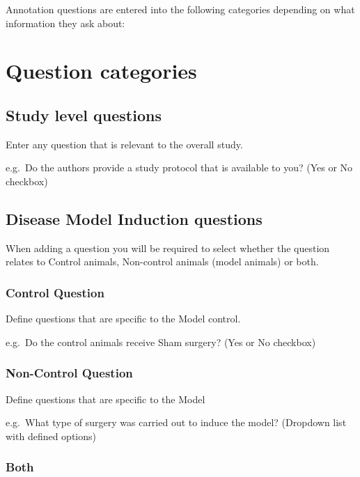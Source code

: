 \documentclass[
]{book}
\begin{document}
Annotation questions are entered into the following categories depending on what information they ask about:

\hypertarget{question-categories-1}{%
\section{Question categories}\label{question-categories-1}}

\hypertarget{study-level-questions}{%
\subsection{Study level questions}\label{study-level-questions}}

Enter any question that is relevant to the overall study.

e.g.~Do the authors provide a study protocol that is available to you?
(Yes or No checkbox)

\hypertarget{disease-model-induction-questions}{%
\subsection{Disease Model Induction questions}\label{disease-model-induction-questions}}

When adding a question you will be required to select whether the question relates to Control animals, Non-control animals (model animals) or both.

\hypertarget{control-question}{%
\subsubsection{Control Question}\label{control-question}}

Define questions that are specific to the Model control.

e.g.~Do the control animals receive Sham surgery?
(Yes or No checkbox)

\hypertarget{non-control-question}{%
\subsubsection{Non-Control Question}\label{non-control-question}}

Define questions that are specific to the Model

e.g.~What type of surgery was carried out to induce the model?
(Dropdown list with defined options)

\hypertarget{both}{%
\subsubsection{Both}\label{both}}
\end{document}
